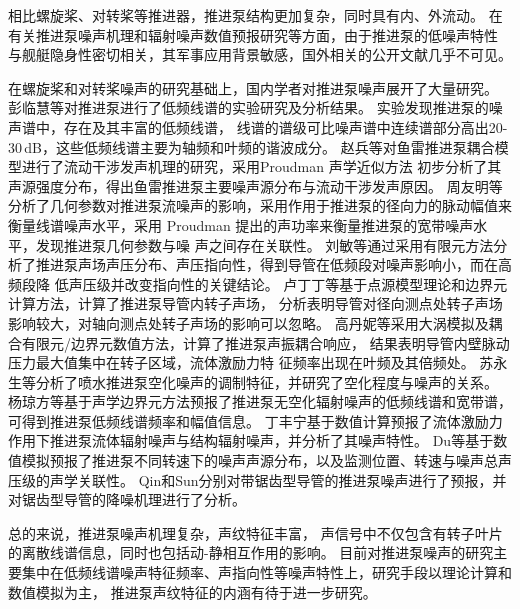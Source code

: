相比螺旋桨、对转桨等推进器，推进泵结构更加复杂，同时具有内、外流动。
在有关推进泵噪声机理和辐射噪声数值预报研究等方面，由于推进泵的低噪声特性
与舰艇隐身性密切相关，其军事应用背景敏感，国外相关的公开文献几乎不可见。

在螺旋桨和对转桨噪声的研究基础上，国内学者对推进泵噪声展开了大量研究。
彭临慧等\cite{__1998彭临慧}对推进泵进行了低频线谱的实验研究及分析结果。
实验发现推进泵的噪声谱中，存在及其丰富的低频线谱，
线谱的谱级可比噪声谱中连续谱部分高出20-30\,dB，这些低频线谱主要为轴频和叶频的谐波成分。
赵兵等\cite{__2009赵兵}对鱼雷推进泵耦合模型进行了流动干涉发声机理的研究，采用Proudman 声学近似方法
初步分析了其声源强度分布，得出鱼雷推进泵主要噪声源分布与流动干涉发声原因。
周友明等\cite{__2011周友明}分析了几何参数对推进泵流噪声的影响，采用作用于推进泵的径向力的脉动幅值来
衡量线谱噪声水平，采用 Proudman 提出的声功率来衡量推进泵的宽带噪声水平，发现推进泵几何参数与噪
声之间存在关联性。
刘敏等\cite{__2011刘敏}通过采用有限元方法分析了推进泵声场声压分布、声压指向性，得到导管在低频段对噪声影响小，而在高频段降
低声压级并改变指向性的关键结论。
卢丁丁等\cite{__2016卢丁丁}基于点源模型理论和边界元计算方法，计算了推进泵导管内转子声场，
分析表明导管对径向测点处转子声场影响较大，对轴向测点处转子声场的影响可以忽略。
高丹妮等\cite{__2018高丹妮}采用大涡模拟及耦合有限元/边界元数值方法，计算了推进泵声振耦合响应，
结果表明导管内壁脉动压力最大值集中在转子区域，流体激励力特
征频率出现在叶频及其倍频处。
苏永生等\cite{__2013苏永生}分析了喷水推进泵空化噪声的调制特征，并研究了空化程度与噪声的关系。
杨琼方等\cite{__2016杨琼方}基于声学边界元方法预报了推进泵无空化辐射噪声的低频线谱和宽带谱，
可得到推进泵低频线谱频率和幅值信息。
丁丰宁\cite{__2019于丰宁}基于数值计算预报了流体激励力作用下推进泵流体辐射噪声与结构辐射噪声，并分析了其噪声特性。
Du等\cite{duNumericalAnalysisFlow2019a}基于数值模拟预报了推进泵不同转速下的噪声声源分布，以及监测位置、转速与噪声总声压级的声学关联性。
Qin\cite{qinUnderwaterRadiatedNoise2019a}和Sun\cite{sunNumericalInvestigationNoise2019}分别对带锯齿型导管的推进泵噪声进行了预报，并对锯齿型导管的降噪机理进行了分析。

总的来说，推进泵噪声机理复杂，声纹特征丰富，
声信号中不仅包含有转子叶片的离散线谱信息，同时也包括动-静相互作用的影响。
目前对推进泵噪声的研究主要集中在低频线谱噪声特征频率、声指向性等噪声特性上，研究手段以理论计算和数值模拟为主，
推进泵声纹特征的内涵有待于进一步研究。

